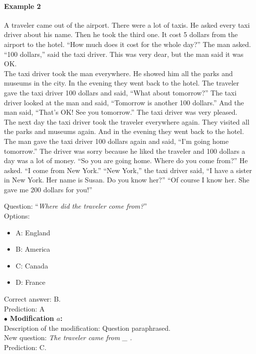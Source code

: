 \paragraph{Example 2}
\begin{passage}
A traveler came out of the airport. There were a lot of taxis. He asked every taxi driver about his name. Then he took the third one. It cost 5 dollars from the airport to the hotel. ``How much does it cost for the whole day?'' The man asked. ``100 dollars,'' said the taxi driver. This was very dear, but the man said it was OK. \\
The taxi driver took the man everywhere. He showed him all the parks and museums in the city. In the evening they went back to the hotel. The traveler gave the taxi driver 100 dollars and said, ``What about tomorrow?'' The taxi driver looked at the man and said, ``Tomorrow is another 100 dollars.'' And the man said, ``That's OK! See you tomorrow.'' The taxi driver was very pleased. \\
The next day the taxi driver took the traveler everywhere again. They visited all the parks and museums again. And in the evening they went back to the hotel. The man gave the taxi driver 100 dollars again and said, ``I'm going home tomorrow.'' The driver was sorry because he liked the traveler and 100 dollars a day was a lot of money. ``So you are going home. Where do you come from?'' He asked. ``I come from New York.'' ``New York,'' the taxi driver said, ``I have a sister in New York. Her name is Susan. Do you know her?'' ``Of course I know her. She gave me 200 dollars for you!'' \\
\end{passage}
Question: ``\emph{Where did the traveler come from?}''\\
Options: 
\begin{itemize}
 \item A: England
 \item B: America
 \item C: Canada
 \item D: France
\end{itemize}
Correct answer: B. \\
Prediction: A\\
\textbf{$\bullet$ Modification $a$:} \\
Description of the modification: Question paraphrased.\\
New question: \emph{The traveler came from \_ .} \\
Prediction: C. \\
